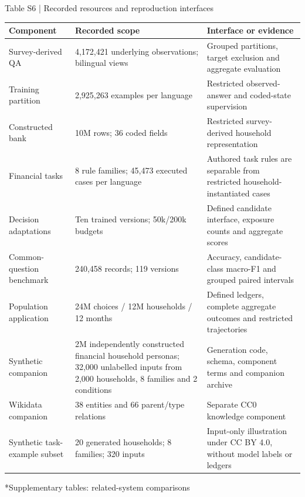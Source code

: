 \documentclass[10pt]{article}
\makeatletter
\renewcommand\section{\@startsection{section}{1}{\z@}{-2.2ex plus -1ex minus -.2ex}{.9ex plus .2ex}{\normalfont\large\mdseries}}
\makeatother
\begin{document}
\begin{center}
\begin{minipage}{\textwidth}
\fontsize{8.5}{10.3}\selectfont
Table S6 | Recorded resources and reproduction interfaces
\par\vspace{4pt}
\begin{tabularx}{\textwidth}{@{}XXX@{}}
\toprule
Component & Recorded scope & Interface or evidence \\
\midrule
Survey-derived QA & 4,172,421 underlying observations; bilingual views & Grouped partitions, target exclusion and aggregate evaluation \\
Training partition & 2,925,263 examples per language & Restricted observed-answer and coded-state supervision \\
Constructed bank & 10M rows; 36 coded fields & Restricted survey-derived household representation \\
Financial tasks & 8 rule families; 45,473 executed cases per language & Authored task rules are separable from restricted household-instantiated cases \\
Decision adaptations & Ten trained versions; 50k/200k budgets & Defined candidate interface, exposure counts and aggregate scores \\
Common-question benchmark & 240,458 records; 119 versions & Accuracy, candidate-class macro-F1 and grouped paired intervals \\
Population application & 24M choices / 12M households / 12 months & Defined ledgers, complete aggregate outcomes and restricted trajectories \\
Synthetic companion & 2M independently constructed financial household personas; 32,000 unlabelled inputs from 2,000 households, 8 families and 2 conditions & Generation code, schema, component terms and companion archive \\
Wikidata companion & 38 entities and 66 parent/type relations & Separate CC0 knowledge component \\
Synthetic task-example subset & 20 generated households; 8 families; 320 inputs & Input-only illustration under CC BY 4.0, without model labels or ledgers \\
\bottomrule
\end{tabularx}
\end{minipage}
\end{center}

\section*{Supplementary tables: related-system comparisons}
\end{document}
